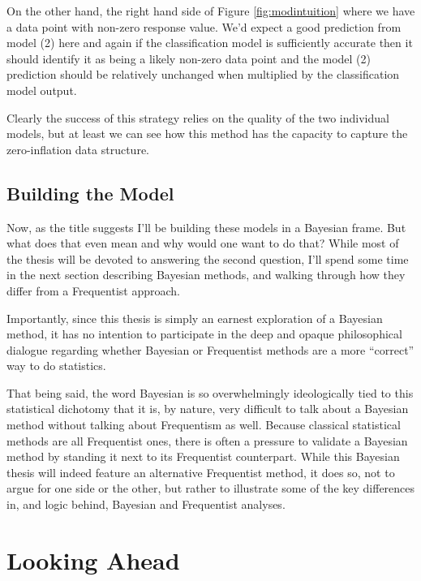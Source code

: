 \documentclass[12pt,twoside]{reedthesis}
\begin{document}
On the other hand, the right hand side of Figure \ref{fig:modintuition} where we have a data point with non-zero response value. We'd expect a good prediction from model (2) here and again if the classification model is sufficiently accurate then it should identify it as being a likely non-zero data point and the model (2) prediction should be relatively unchanged when multiplied by the classification model output.

Clearly the success of this strategy relies on the quality of the two individual models, but at least we can see how this method has the capacity to capture the zero-inflation data structure.

\hypertarget{building-the-model}{%
\subsection{Building the Model}\label{building-the-model}}

Now, as the title suggests I'll be building these models in a Bayesian frame. But what does that even mean and why would one want to do that? While most of the thesis will be devoted to answering the second question, I'll spend some time in the next section describing Bayesian methods, and walking through how they differ from a Frequentist approach.

Importantly, since this thesis is simply an earnest exploration of a Bayesian method, it has no intention to participate in the deep and opaque philosophical dialogue regarding whether Bayesian or Frequentist methods are a more ``correct'' way to do statistics.

That being said, the word Bayesian is so overwhelmingly ideologically tied to this statistical dichotomy that it is, by nature, very difficult to talk about a Bayesian method without talking about Frequentism as well. Because classical statistical methods are all Frequentist ones, there is often a pressure to validate a Bayesian method by standing it next to its Frequentist counterpart. While this Bayesian thesis will indeed feature an alternative Frequentist method, it does so, not to argue for one side or the other, but rather to illustrate some of the key differences in, and logic behind, Bayesian and Frequentist analyses.

\hypertarget{looking-ahead}{%
\section{Looking Ahead}\label{looking-ahead}}
\end{document}
